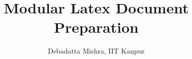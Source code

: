 \documentclass[a4paper, 10pt,twocolumn]{article}
\title{Modular Latex Document Preparation}
\author{Debadatta Mishra, IIT Kanpur}
\date{}
\begin{document}
\maketitle
\begin{abstract}

\end{abstract}    










\end{document}
